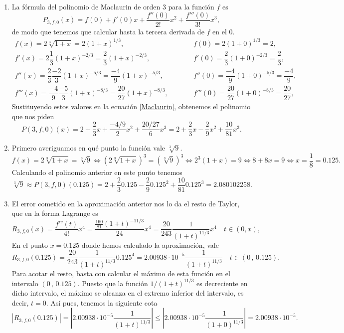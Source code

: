 {\begin{enumerate}
\item   La fórmula del polinomio de Maclaurin de orden $3$ para la
    función $f$ es
\begin{equation}
    P_{3,f,0} (x)= f(0)+
    f'(0)x+\frac{f''(0)}{2!}x^2+\frac{f'''(0)}{3!}x^3,
    \label{Maclaurin}
\end{equation}
de modo que tenemos que calcular hasta la tercera derivada de $f$ en el 0.
\[ \renewcommand{\arraystretch}{2}
    \begin{array}{lll}
        f(x)=2\sqrt[3]{{1 + x}}=2(1+x)^{1/3}, & \quad \quad & f(0)=2(1+0)^{1/3}=2,  \\
        f'(x)=2\dfrac{1}{3}(1+x)^{-2/3}=\dfrac{2}{3}(1+x)^{-2/3}, &  & f'(0)=\dfrac{2}{3}(1+0)^{-2/3}=\dfrac{2}{3},\\
        f''(x)=\dfrac{2}{3}\dfrac{-2}{3}(1+x)^{-5/3}=\dfrac{-4}{9}(1+x)^{-5/3}, &  & f''(0)=\dfrac{-4}{9}(1+0)^{-5/3}=\dfrac{-4}{9},\\
        f'''(x)=\dfrac{-4}{9}\dfrac{-5}{3}(1+x)^{-8/3}=\dfrac{20}{27}(1+x)^{-8/3}, &  & f'''(0)=\dfrac{20}{27}(1+0)^{-8/3}=\dfrac{20}{27},
     \end{array}
\]
Sustituyendo estos valores en la ecuación \ref{Maclaurin},
obtenemos el polinomio que nos piden
\[
P(3,f,0)(x)= 2+\frac{2}{3}x+\frac{-4/9}{2}x^2+\frac{20/27}{6}x^3=
2+\frac{2}{3}x-\frac{2}{9}x^2+\frac{10}{81}x^3.
\]

\item Primero averiguamos en qué punto la función vale $\sqrt[3]{9}$.
\[
f(x)=2\sqrt[3]{1+x}=\sqrt[3]{9} \Leftrightarrow (2\sqrt[3]{1+x})^3=(\sqrt[3]{9})^3 \Leftrightarrow
2^3(1+x)=9 \Leftrightarrow 8+8x=9 \Leftrightarrow x=\frac{1}{8}=0.125.
\]
Calculando el polinomio anterior en este punto tenemos
\[
\sqrt[3]{9}\approx P(3,f,0)(0.125)= 2+\frac{2}{3}0.125-\frac{2}{9}0.125^2+\frac{10}{81}0.125^3=2.080102258.
\]

\item El error cometido en la aproximación anterior nos lo da el resto de Taylor, que en la forma
Lagrange es
\[
R_{3,f,0}(x)=\frac{f^{iv}(t)}{4!}x^4=\frac{\frac{160}{81} (1+t)^{-11/3}}{24}x^4 = \frac{20}{243}\frac{1}{(1+t)^{11/3}} x^4 \quad t\in(0,x),
\]
En el punto $x=0.125$ donde hemos calculado la aproximación, vale
\[
R_{3,f,0}(0.125)=\frac{20}{243}\frac{1}{(1+t)^{11/3}} 0.125^4= 2.00938\cdot 10^{-5}\frac{1}{(1+t)^{11/3}} \quad t\in(0\,,\,0.125).
\]
Para acotar el resto, basta con calcular el máximo de esta función en el
intervalo $(0\,,\,0.125)$. Puesto que la función $1/(1+t)^{11/3}$ es decreciente en dicho intervalo,
el máximo se alcanza en el extremo inferior del intervalo, es decir,
$t=0$. Así pues, tenemos la siguiente cota
\[
|R_{3,f,0}(0.125)|=|2.00938\cdot 10^{-5}\frac{1}{(1+t)^{11/3}}|\leq
|2.00938\cdot 10^{-5}\frac{1}{(1+0)^{11/3}}|=2.00938\cdot 10^{-5}.
\]
\end{enumerate}
}


